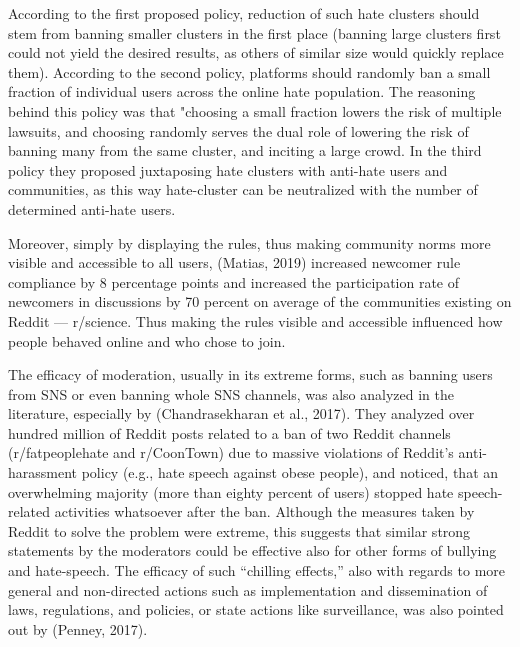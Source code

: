 \documentclass[
  10pt,
  dvipsnames]{scrartcl}
\begin{document}
According to the first proposed policy, reduction of such hate clusters
should stem from banning smaller clusters in the first place (banning
large clusters first could not yield the desired results, as others of
similar size would quickly replace them). According to the second
policy, platforms should randomly ban a small fraction of individual
users across the online hate population. The reasoning behind this
policy was that "choosing a small fraction lowers the risk of multiple
lawsuits, and choosing randomly serves the dual role of lowering the
risk of banning many from the same cluster, and inciting a large crowd.
In the third policy they proposed juxtaposing hate clusters with
anti-hate users and communities, as this way hate-cluster can be
neutralized with the number of determined anti-hate users.

Moreover, simply by displaying the rules, thus making community norms
more visible and accessible to all users, (Matias, 2019) increased
newcomer rule compliance by 8 percentage points and increased the
participation rate of newcomers in discussions by 70 percent on average
of the communities existing on Reddit --- r/science. Thus making the
rules visible and accessible influenced how people behaved online and
who chose to join.

The efficacy of moderation, usually in its extreme forms, such as
banning users from SNS or even banning whole SNS channels, was also
analyzed in the literature, especially by (Chandrasekharan et al.,
2017). They analyzed over hundred million of Reddit posts related to a
ban of two Reddit channels (r/fatpeoplehate and r/CoonTown) due to
massive violations of Reddit's anti-harassment policy (e.g., hate speech
against obese people), and noticed, that an overwhelming majority (more
than eighty percent of users) stopped hate speech-related activities
whatsoever after the ban. Although the measures taken by Reddit to solve
the problem were extreme, this suggests that similar strong statements
by the moderators could be effective also for other forms of bullying
and hate-speech. The efficacy of such ``chilling effects,'' also with
regards to more general and non-directed actions such as implementation
and dissemination of laws, regulations, and policies, or state actions
like surveillance, was also pointed out by (Penney, 2017).
\end{document}
